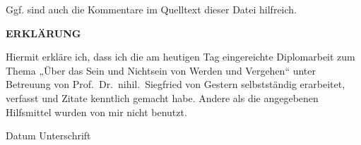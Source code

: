 \documentclass{scrbook}
\begin{document}
Ggf. sind auch die Kommentare im Quelltext dieser Datei hilfreich.



\backmatter








\printbibliography{}

\printindex

\cleardoublepage

\thispagestyle{empty}

\hbox{}\vfill

\textbf{\large ERKLÄRUNG}

\bigskip \medskip

Hiermit erkläre ich, dass ich die am heutigen Tag eingereichte Diplomarbeit zum
Thema „Über das Sein und Nichtsein von Werden und Vergehen“ unter Betreuung von
Prof.~Dr.~nihil.~Siegfried von Gestern selbstständig erarbeitet, verfasst und
Zitate kenntlich gemacht habe. Andere als die angegebenen Hilfsmittel wurden von
mir nicht benutzt.

\vspace*{5\bigskipamount}

Datum \hfill Unterschrift

\normalsize

\vspace*{2\bigskipamount}

\vfill\hbox{}
\end{document}
